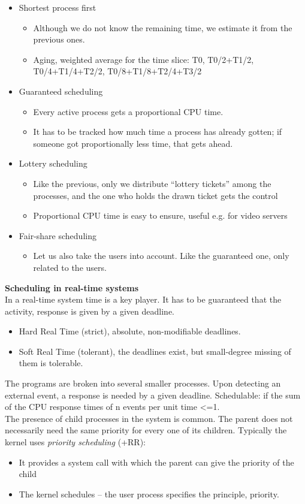 \documentclass[margin=0px]{article}
\begin{document}
\begin{itemize}
    \item Shortest process first
          \begin{itemize}
              \item Although we do not know the remaining time, we estimate it from the previous ones.
              \item Aging, weighted average for the time slice: T0, T0/2+T1/2, T0/4+T1/4+T2/2, T0/8+T1/8+T2/4+T3/2
          \end{itemize}
    \item Guaranteed scheduling
          \begin{itemize}
              \item Every active process gets a proportional CPU time.
              \item It has to be tracked how much time a process has already gotten; if someone got proportionally less time, that gets ahead.
          \end{itemize}
    \item Lottery scheduling
          \begin{itemize}
              \item Like the previous, only we distribute ``lottery tickets'' among the processes, and the one who holds the drawn ticket gets the control
              \item Proportional CPU time is easy to ensure, useful e.g. for video servers
          \end{itemize}
    \item Fair-share scheduling
          \begin{itemize}
              \item Let us also take the users into account. Like the guaranteed one, only related to the users.
          \end{itemize}
\end{itemize}
\textbf{Scheduling in real-time systems} \\
In a real-time system time is a key player. It has to be guaranteed that the activity, response is given by a given deadline.
\begin{itemize}
    \item Hard Real Time (strict), absolute, non-modifiable deadlines.
    \item Soft Real Time (tolerant), the deadlines exist, but small-degree missing of them is tolerable.
\end{itemize}
The programs are broken into several smaller processes. Upon detecting an external event, a response is needed by a given deadline. Schedulable: if the sum of the CPU response times of n events per unit time <=1. \\
The presence of child processes in the system is common. The parent does not necessarily need the same priority for every one of its children. Typically the kernel uses \textit{priority scheduling}
(+RR):
\begin{itemize}
    \item It provides a system call with which the parent can give the priority of the child
    \item The kernel schedules -- the user process specifies the principle, priority.
\end{itemize}
\end{document}
